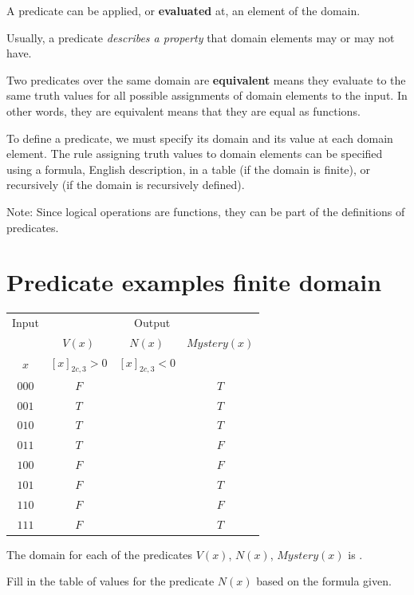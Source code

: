 \documentclass[12pt, oneside]{article}
\begin{document}
A predicate can be applied, or {\bf evaluated} at, an element of the domain.

Usually, a predicate {\it describes a  property} that domain elements may or may not have.

Two predicates over the same domain are {\bf equivalent} means they evaluate to
the same truth values for all possible assignments of domain elements to the
input. In other words, they are equivalent means that they are equal as functions.

To define a predicate, we must specify its domain and its value at each domain element.
The rule assigning truth values to domain elements can be specified using a formula, 
English description, in a table (if the domain is finite), or recursively (if the domain is recursively
defined).

Note: Since logical operations are functions, they can be part of the definitions of predicates. \vfill
\section*{Predicate examples finite domain}


\begin{center}
    \begin{tabular}{c||c|c|c}
    Input & \multicolumn{3}{c}{Output} \\
    &$V(x)$ & $N(x)$ & $Mystery(x)$\\
    $x$ & $[x]_{2c,3} > 0$ & $[x]_{2c,3} < 0$& \\
    \hline
    $000$  & $F$ & & $T$\\
    $001$  & $T$ & & $T$\\
    $010$  & $T$ & & $T$\\
    $011$  & $T$ & & $F$\\
    $100$  & $F$ & & $F$\\
    $101$  & $F$ & & $T$\\
    $110$  & $F$ & & $F$\\
    $111$  & $F$ & & $T$\\
    \end{tabular}
    \end{center}
    
    The domain for each of the predicates $V(x)$, $N(x)$, $Mystery(x)$ is
    \underline{}.

    Fill in the table of values for the predicate $N(x)$ based on the formula given. \vfill
\end{document}
